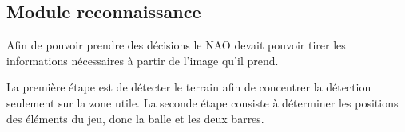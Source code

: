 \subsection{Module reconnaissance}
\label{sub:Module reconnaissance}
  \par Afin de pouvoir prendre des décisions le NAO devait pouvoir tirer les informations nécessaires à partir de l'image qu'il prend.
  \par La première étape est de détecter le terrain afin de concentrer la détection seulement sur la zone utile.
  La seconde étape consiste à déterminer les positions des éléments du jeu, donc la balle et les deux barres.
  
  
\pagebreak

